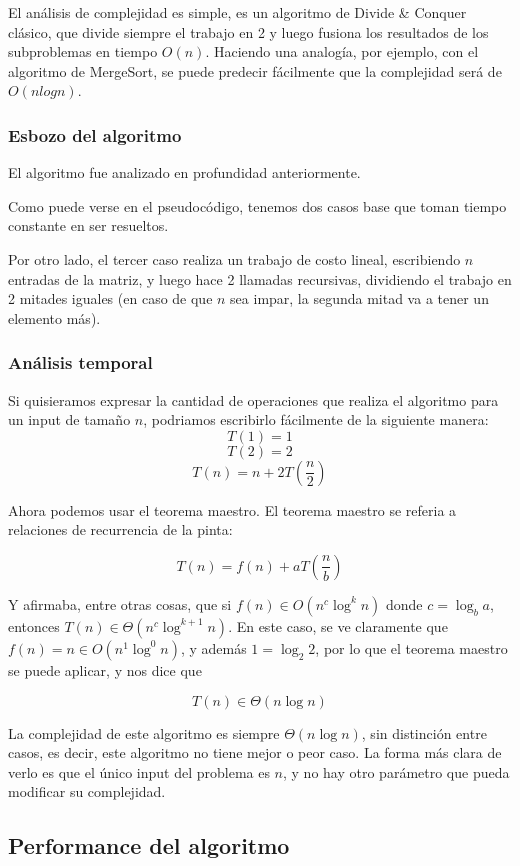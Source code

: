 El análisis de complejidad es simple, es un algoritmo de Divide \& Conquer clásico, que divide siempre el trabajo en 2 y luego fusiona los resultados de los subproblemas en tiempo $O(n)$. Haciendo una analogía, por ejemplo, con el algoritmo de MergeSort, se puede predecir fácilmente que la complejidad será de $O(nlogn)$.

\subsubsection{Esbozo del algoritmo}

El algoritmo fue analizado en profundidad anteriormente. 

Como puede verse en el pseudocódigo, tenemos dos casos base que toman tiempo constante en ser resueltos.

Por otro lado, el tercer caso realiza un trabajo de costo lineal, escribiendo $n$ entradas de la matriz, y luego hace 2 llamadas recursivas, dividiendo el trabajo en 2 mitades iguales (en caso de que $n$ sea impar, la segunda mitad va a tener un elemento más).

\subsubsection{Análisis temporal}
Si quisieramos expresar la cantidad de operaciones que realiza el algoritmo para un input de tamaño $n$, podriamos escribirlo fácilmente de la siguiente manera:
\[T(1) = 1\]
\[T(2) = 2\]
\[T(n) = n + 2 T \left(\frac{n}{2}\right)\]

Ahora podemos usar el teorema maestro. El teorema maestro se referia a relaciones de recurrencia de la pinta:

\[T(n) = f(n) + a T\left(\frac{n}{b}\right)\]

Y afirmaba, entre otras cosas, que si $f(n) \in O(n^c \log^k n)$ donde $c = \log_b a$, entonces $T(n) \in \Theta(n^c \log^{k+1} n)$. En este caso, se ve claramente que $f(n) = n \in O(n^1 \log^0 n)$, y además $1 = \log_2 2$, por lo que el teorema maestro se puede aplicar, y nos dice que

\[T(n) \in \Theta(n \log n)\]

La complejidad de este algoritmo es siempre $\Theta(n \log n)$, sin distinción entre casos, es decir, este algoritmo no tiene mejor o peor caso. La forma más clara de verlo es que el único input del problema es $n$, y no hay otro parámetro que pueda modificar su complejidad.

\subsection{Performance del algoritmo}

